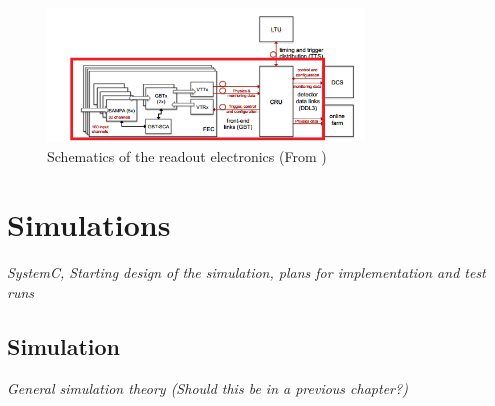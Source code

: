 \documentclass[a4paper]{report}
\begin{document}
\begin{figure}[h!]
	\centering
		\includegraphics[width=0.75\textwidth]{images/fec.png}
		\caption{Schematics of the readout electronics (From \cite{tdr-016})}
		\label{fig:pad-struct}
\end{figure}

\chapter{Simulations}
\label{cha:4}
\textit{SystemC, Starting design of the simulation, plans for implementation and test runs}

\section{Simulation}
\textit{General simulation theory (Should this be in a previous chapter?)}
\end{document}
